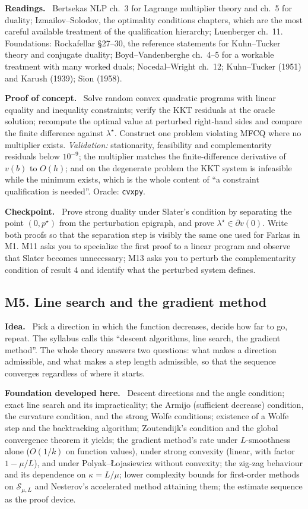 \documentclass[11pt,a4paper]{article}
\newcommand{\mpart}[1]{\smallskip\noindent\textbf{#1}\ \ignorespaces}
\begin{document}
\mpart{Readings.} Bertsekas NLP ch.~3 for Lagrange multiplier theory and ch.~5 for duality;
Izmailov--Solodov, the optimality conditions chapters, which are the most careful available
treatment of the qualification hierarchy; Luenberger ch.~11. Foundations: Rockafellar
\S 27--30, the reference statements for Kuhn--Tucker theory and conjugate duality;
Boyd--Vandenberghe ch.~4--5 for a workable treatment with many worked duals;
Nocedal--Wright ch.~12; Kuhn--Tucker (1951) and Karush (1939); Sion (1958).

\mpart{Proof of concept.} Solve random convex quadratic programs with linear equality and
inequality constraints; verify the KKT residuals at the oracle solution; recompute the optimal
value at perturbed right-hand sides and compare the finite difference against
$\lambda^\star$. Construct one problem violating MFCQ where no multiplier exists.
\emph{Validation:} stationarity, feasibility and complementarity residuals below $10^{-9}$;
the multiplier matches the finite-difference derivative of $v(b)$ to $O(h)$; and on the
degenerate problem the KKT system is infeasible while the minimum exists, which is the whole
content of ``a constraint qualification is needed''. Oracle: \texttt{cvxpy}.

\mpart{Checkpoint.} Prove strong duality under Slater's condition by separating the point
$(0, p^\star)$ from the perturbation epigraph, and prove $\lambda^\star \in \partial v(0)$.
Write both proofs so that the separation step is visibly the same one used for Farkas in M1.
M11 asks you to specialize the first proof to a linear program and observe that Slater becomes
unnecessary; M13 asks you to perturb the complementarity condition of result 4 and identify
what the perturbed system defines.

\clearpage

\subsection{M5. Line search and the gradient method}

\mpart{Idea.} Pick a direction in which the function decreases, decide how far to go, repeat.
The syllabus calls this ``descent algorithms, line search, the gradient method''. The whole
theory answers two questions: what makes a direction admissible, and what makes a step length
admissible, so that the sequence converges regardless of where it starts.

\mpart{Foundation developed here.} Descent directions and the angle condition; exact line
search and its impracticality; the Armijo (sufficient decrease) condition, the curvature
condition, and the strong Wolfe conditions; existence of a Wolfe step and the backtracking
algorithm; Zoutendijk's condition and the global convergence theorem it yields; the gradient
method's rate under $L$-smoothness alone ($O(1/k)$ on function values), under strong convexity
(linear, with factor $1-\mu/L$), and under Polyak--{\L}ojasiewicz without convexity; the
zig-zag behaviour and its dependence on $\kappa=L/\mu$; lower complexity bounds for
first-order methods on $\mathcal{S}_{\mu,L}$ and Nesterov's accelerated method attaining them;
the estimate sequence as the proof device.
\end{document}
